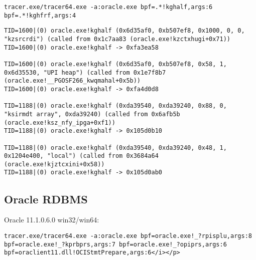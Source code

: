 \begin{lstlisting}
tracer.exe/tracer64.exe -a:oracle.exe bpf=.*!kghalf,args:6 bpf=.*!kghfrf,args:4
\end{lstlisting}

\begin{lstlisting}
TID=1600|(0) oracle.exe!kghalf (0x6d35af0, 0xb507ef8, 0x1000, 0, 0, "kzsrcrdi") (called from 0x1c7aa83 (oracle.exe!kzctxhugi+0x71))
TID=1600|(0) oracle.exe!kghalf -> 0xfa3ea58

TID=1600|(0) oracle.exe!kghalf (0x6d35af0, 0xb507ef8, 0x58, 1, 0x6d35530, "UPI heap") (called from 0x1e7f8b7 (oracle.exe!__PGOSF266_kwqmahal+0x5b))
TID=1600|(0) oracle.exe!kghalf -> 0xfa4d0d8

TID=1188|(0) oracle.exe!kghalf (0xda39540, 0xda39240, 0x88, 0, "ksirmdt array", 0xda39240) (called from 0x6afb5b (oracle.exe!ksz_nfy_ipga+0xf1))
TID=1188|(0) oracle.exe!kghalf -> 0x105d0b10

TID=1188|(0) oracle.exe!kghalf (0xda39540, 0xda39240, 0x48, 1, 0x1204e400, "local") (called from 0x3684a64 (oracle.exe!kjztcxini+0x58))
TID=1188|(0) oracle.exe!kghalf -> 0x105d0ab0
\end{lstlisting}

\subsection{ Oracle RDBMS}

 Oracle 11.1.0.6.0 win32/win64:

\begin{lstlisting}
tracer.exe/tracer64.exe -a:oracle.exe bpf=oracle.exe!_?rpisplu,args:8 bpf=oracle.exe!_?kprbprs,args:7 bpf=oracle.exe!_?opiprs,args:6 bpf=oraclient11.dll!OCIStmtPrepare,args:6</i></p>
\end{lstlisting}


